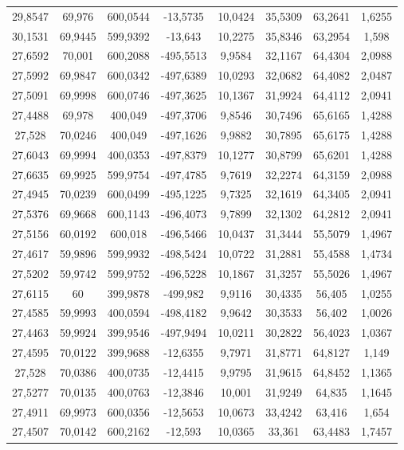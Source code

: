 \begin{longtable}{@{}cccccccc@{}}
29,8547 & 69,976 & 600,0544 & -13,5735 & 10,0424 & 35,5309 & 63,2641 & 1,6255 \\
30,1531 & 69,9445 & 599,9392 & -13,643 & 10,2275 & 35,8346 & 63,2954 & 1,598 \\
27,6592 & 70,001 & 600,2088 & -495,5513 & 9,9584 & 32,1167 & 64,4304 & 2,0988 \\
27,5992 & 69,9847 & 600,0342 & -497,6389 & 10,0293 & 32,0682 & 64,4082 & 2,0487 \\
27,5091 & 69,9998 & 600,0746 & -497,3625 & 10,1367 & 31,9924 & 64,4112 & 2,0941 \\
27,4488 & 69,978 & 400,049 & -497,3706 & 9,8546 & 30,7496 & 65,6165 & 1,4288 \\
27,528 & 70,0246 & 400,049 & -497,1626 & 9,9882 & 30,7895 & 65,6175 & 1,4288 \\
27,6043 & 69,9994 & 400,0353 & -497,8379 & 10,1277 & 30,8799 & 65,6201 & 1,4288 \\
27,6635 & 69,9925 & 599,9754 & -497,4785 & 9,7619 & 32,2274 & 64,3159 & 2,0988 \\
27,4945 & 70,0239 & 600,0499 & -495,1225 & 9,7325 & 32,1619 & 64,3405 & 2,0941 \\
27,5376 & 69,9668 & 600,1143 & -496,4073 & 9,7899 & 32,1302 & 64,2812 & 2,0941 \\
27,5156 & 60,0192 & 600,018 & -496,5466 & 10,0437 & 31,3444 & 55,5079 & 1,4967 \\
27,4617 & 59,9896 & 599,9932 & -498,5424 & 10,0722 & 31,2881 & 55,4588 & 1,4734 \\
27,5202 & 59,9742 & 599,9752 & -496,5228 & 10,1867 & 31,3257 & 55,5026 & 1,4967 \\
27,6115 & 60 & 399,9878 & -499,982 & 9,9116 & 30,4335 & 56,405 & 1,0255 \\
27,4585 & 59,9993 & 400,0594 & -498,4182 & 9,9642 & 30,3533 & 56,402 & 1,0026 \\
27,4463 & 59,9924 & 399,9546 & -497,9494 & 10,0211 & 30,2822 & 56,4023 & 1,0367 \\
27,4595 & 70,0122 & 399,9688 & -12,6355 & 9,7971 & 31,8771 & 64,8127 & 1,149 \\
27,528 & 70,0386 & 400,0735 & -12,4415 & 9,9795 & 31,9615 & 64,8452 & 1,1365 \\
27,5277 & 70,0135 & 400,0763 & -12,3846 & 10,001 & 31,9249 & 64,835 & 1,1645 \\
27,4911 & 69,9973 & 600,0356 & -12,5653 & 10,0673 & 33,4242 & 63,416 & 1,654 \\
27,4507 & 70,0142 & 600,2162 & -12,593 & 10,0365 & 33,361 & 63,4483 & 1,7457 \\

\end{longtable}
